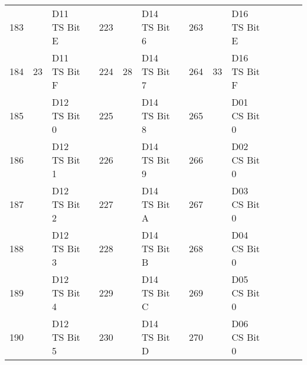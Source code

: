 \documentclass[]{article}
\begin{document}
\begin{landscape}
\begin{table}[]
\begin{tabular}{lllllllllllllll}
			183          &                      & D11 TS Bit E      &                    & 223          &                      & D14 TS Bit 6      &  & 263          &                      & D16 TS Bit E      &  & \cellcolor[HTML]{EFEFEF} & \cellcolor[HTML]{EFEFEF}                   & \cellcolor[HTML]{EFEFEF} \\
			184          & \multirow{-8}{*}{23} & D11 TS Bit F      &                    & 224          & \multirow{-8}{*}{28} & D14 TS Bit 7      &  & 264          & \multirow{-8}{*}{33} & D16 TS Bit F      &  & \cellcolor[HTML]{EFEFEF} & \multirow{-8}{*}{\cellcolor[HTML]{EFEFEF}} & \cellcolor[HTML]{EFEFEF} \\ \cline{1-3} \cline{5-7} \cline{9-11} \cline{13-15} 
			185          &                      & D12 TS Bit 0      &                    & 225          &                      & D14 TS Bit 8      &  & 265          &                      & D01 CS Bit 0      &  & \cellcolor[HTML]{EFEFEF} & \cellcolor[HTML]{EFEFEF}                   & \cellcolor[HTML]{EFEFEF} \\
			186          &                      & D12 TS Bit 1      &                    & 226          &                      & D14 TS Bit 9      &  & 266          &                      & D02 CS Bit 0      &  & \cellcolor[HTML]{EFEFEF} & \cellcolor[HTML]{EFEFEF}                   & \cellcolor[HTML]{EFEFEF} \\
			187          &                      & D12 TS Bit 2      &                    & 227          &                      & D14 TS Bit A      &  & 267          &                      & D03 CS Bit 0      &  & \cellcolor[HTML]{EFEFEF} & \cellcolor[HTML]{EFEFEF}                   & \cellcolor[HTML]{EFEFEF} \\
			188          &                      & D12 TS Bit 3      &                    & 228          &                      & D14 TS Bit B      &  & 268          &                      & D04 CS Bit 0      &  & \cellcolor[HTML]{EFEFEF} & \cellcolor[HTML]{EFEFEF}                   & \cellcolor[HTML]{EFEFEF} \\
			189          &                      & D12 TS Bit 4      &                    & 229          &                      & D14 TS Bit C      &  & 269          &                      & D05 CS Bit 0      &  & \cellcolor[HTML]{EFEFEF} & \cellcolor[HTML]{EFEFEF}                   & \cellcolor[HTML]{EFEFEF} \\
			190          &                      & D12 TS Bit 5      &                    & 230          &                      & D14 TS Bit D      &  & 270          &                      & D06 CS Bit 0      &  & \cellcolor[HTML]{EFEFEF} & \cellcolor[HTML]{EFEFEF}                   & \cellcolor[HTML]{EFEFEF} \\

\end{tabular}
\end{table}
\end{landscape}
\end{document}
